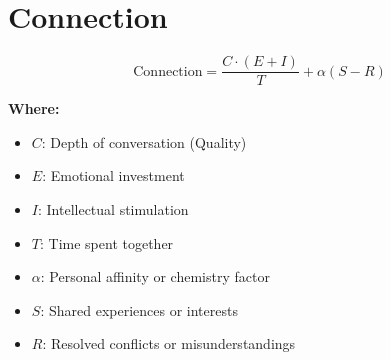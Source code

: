 \chapter{Connection}

\begin{equation}
\text{Connection} = \frac{C \cdot (E + I)}{T} + \alpha (S - R)
\end{equation}

\textbf{Where:}

\begin{itemize}
    \item $C$: Depth of conversation (Quality)
    \item $E$: Emotional investment
    \item $I$: Intellectual stimulation
    \item $T$: Time spent together
    \item $\alpha$: Personal affinity or chemistry factor
    \item $S$: Shared experiences or interests
    \item $R$: Resolved conflicts or misunderstandings
\end{itemize}
